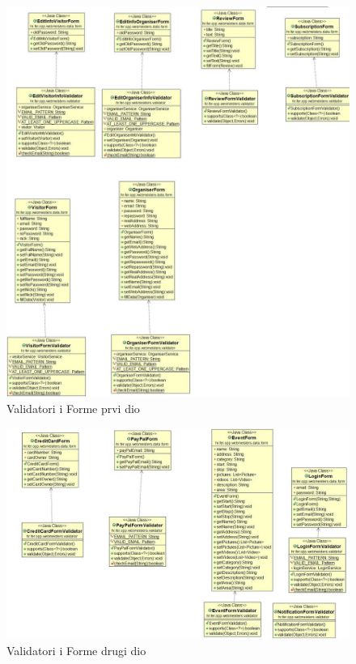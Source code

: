 		\begin{figure}[H]
			\includegraphics[scale=0.4]{slike/dijagram4a.jpg}
			\centering
			\caption{Validatori i Forme prvi dio}
			\label{fig:dijagramraz7}
		\end{figure}
	
		\begin{figure}[H]
			\includegraphics[scale=0.4]{slike/dijagram4b.jpg}
			\centering
			\caption{Validatori i Forme drugi dio}
			\label{fig:dijagramraz8}
		\end{figure}
	
